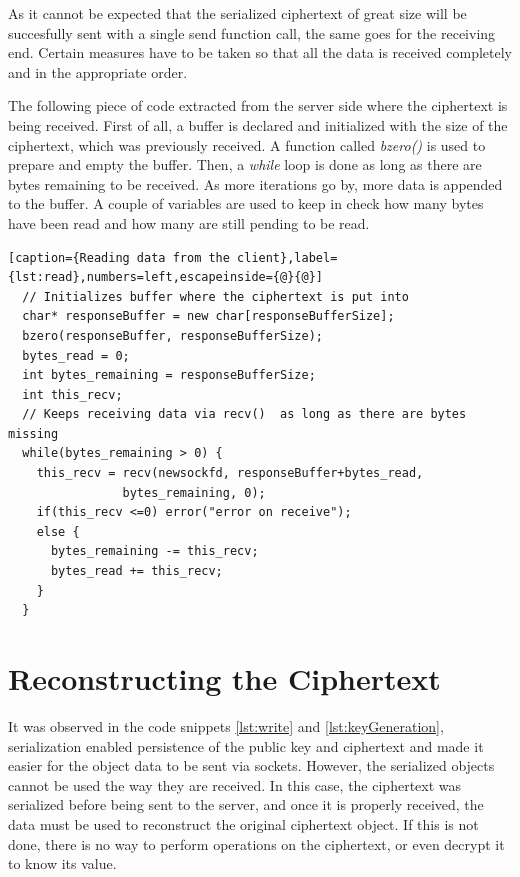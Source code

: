 As it cannot be expected that the serialized ciphertext of great size will be succesfully sent with a single send function call, the same goes for the receiving end. Certain measures have to be taken so that all the data is received completely and in the appropriate order.

The following piece of code extracted from the server side where the ciphertext is being received. First of all, a buffer is declared and initialized with the size of the ciphertext, which was previously received. A function called \textit{bzero()} is used to prepare and empty the buffer. Then, a \textit{while} loop is done as long as there are bytes remaining to be received. As more iterations go by, more data is appended to the buffer. A couple of variables are used to keep in check how many bytes have been read and how many are still pending to be read.

\begin{lstlisting}[caption={Reading data from the client},label={lst:read},numbers=left,escapeinside={@}{@}]
  // Initializes buffer where the ciphertext is put into
  char* responseBuffer = new char[responseBufferSize];
  bzero(responseBuffer, responseBufferSize);
  bytes_read = 0;
  int bytes_remaining = responseBufferSize;
  int this_recv;
  // Keeps receiving data via recv()  as long as there are bytes missing
  while(bytes_remaining > 0) {    
    this_recv = recv(newsockfd, responseBuffer+bytes_read,
                bytes_remaining, 0); 
    if(this_recv <=0) error("error on receive");
    else {
      bytes_remaining -= this_recv;
      bytes_read += this_recv;
    }
  }
\end{lstlisting}

\section{{Reconstructing the Ciphertext}}

It was observed in the code snippets \ref{lst:write} and \ref{lst:keyGeneration}, serialization enabled persistence of the public key and ciphertext and made it easier for the object data to be sent via sockets. However, the serialized objects cannot be used the way they are received. In this case, the ciphertext was serialized before being sent to the server, and once it is properly received, the data must be used to reconstruct the original ciphertext object.
If this is not done, there is no way to perform operations on the ciphertext, or even decrypt it to know its value.


